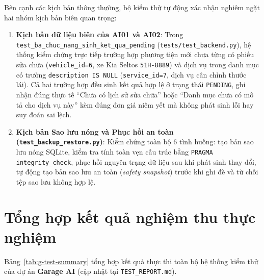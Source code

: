 Bên cạnh các kịch bản thông thường, bộ kiểm thử tự động xác nhận nghiêm ngặt hai nhóm kịch bản biên quan trọng:
\begin{enumerate}[noitemsep,topsep=2pt]
  \item \textbf{Kịch bản dữ liệu biên của AI01 và AI02}:
  Trong \texttt{test\_ba\_chuc\_nang\_sinh\_ket\_qua\_pending} (\texttt{tests/test\_backend.py}), hệ thống kiểm chứng trực tiếp trường hợp phương tiện mới chưa từng có phiếu sửa chữa (\texttt{vehicle\_id=6}, xe Kia Seltos \texttt{51H-8889}) và dịch vụ trong danh mục có trường \texttt{description IS NULL} (\texttt{service\_id=7}, dịch vụ cân chỉnh thước lái). Cả hai trường hợp đều sinh kết quả hợp lệ ở trạng thái \texttt{PENDING}, ghi nhận đúng thực tế “Chưa có lịch sử sửa chữa” hoặc “Danh mục chưa có mô tả cho dịch vụ này” kèm đúng đơn giá niêm yết mà không phát sinh lỗi hay suy đoán sai lệch.
  \item \textbf{Kịch bản Sao lưu nóng và Phục hồi an toàn (\texttt{test\_backup\_restore.py})}:
  Kiểm chứng toàn bộ 6 tình huống: tạo bản sao lưu nóng SQLite, kiểm tra tính toàn vẹn cấu trúc bằng \texttt{PRAGMA integrity\_check}, phục hồi nguyên trạng dữ liệu sau khi phát sinh thay đổi, tự động tạo bản sao lưu an toàn (\textit{safety snapshot}) trước khi ghi đè và từ chối tệp sao lưu không hợp lệ.
\end{enumerate}

\section{Tổng hợp kết quả nghiệm thu thực nghiệm}

Bảng~\ref{tab:g-test-summary} tổng hợp kết quả thực thi toàn bộ hệ thống kiểm thử của dự án \textbf{Garage AI} (cập nhật tại \texttt{TEST\_REPORT.md}).

